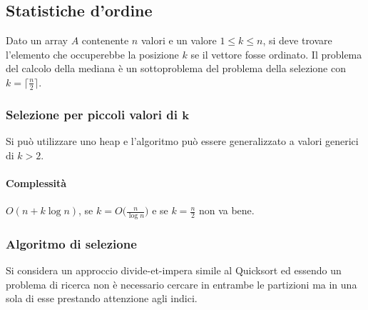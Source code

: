 \subsection{Statistiche d'ordine}
Dato un array $A$ contenente $n$ valori e un valore $1\le k \le n$, si deve trovare l'elemento che occuperebbe la posizione $k$ se il vettore fosse ordinato. Il problema del calcolo 
della mediana \`e un sottoproblema del problema della selezione con $k = \bigl\lceil\frac{n}{2}\bigr\rceil$.
\subsubsection{Selezione per piccoli valori di $\mathbf{k}$}
Si pu\`o utilizzare uno heap e l'algoritmo pu\`o essere generalizzato a valori generici di $k>2$. 
\begin{multicols}{2}

\columnbreak
\paragraph{Complessit\`a}\mbox{}
$O(n + k\log n)$, se $k = O\bigl(\frac{n}{\log n}\bigr)$ e se $k = \frac{n}{2}$ non va bene. 
\end{multicols}
\subsubsection{Algoritmo di selezione}
Si considera un approccio divide-et-impera simile al Quicksort ed essendo un problema di ricerca non \`e necessario cercare in entrambe le partizioni ma in una sola di esse prestando 
attenzione agli indici. 

